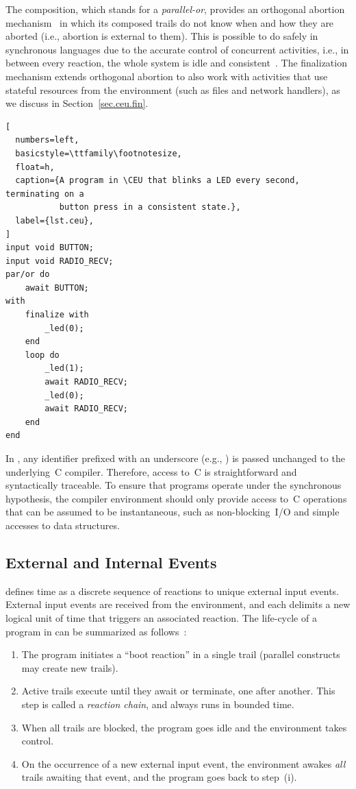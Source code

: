 The  composition, which stands for a \emph{parallel-or}, provides
an orthogonal abortion mechanism~\cite{esterel.preemption} in which its
composed trails do not know when and how they are aborted (i.e., abortion is
external to them).
%
This is possible to do safely in synchronous languages due to the accurate
control of concurrent activities, i.e., in between every reaction, the whole
system is idle and consistent~\cite{esterel.preemption}.
%
The finalization mechanism extends orthogonal abortion to also work with
activities that use stateful resources from the environment (such as files and
network handlers), as we discuss in Section~\ref{sec.ceu.fin}.
%

\begin{lstlisting}[
  numbers=left,
  basicstyle=\ttfamily\footnotesize,
  float=h,
  caption={A program in \CEU that blinks a LED every second, terminating on a
           button press in a consistent state.},
  label={lst.ceu},
]
input void BUTTON;
input void RADIO_RECV;
par/or do
    await BUTTON;
with
    finalize with
        _led(0);
    end
    loop do
        _led(1);
        await RADIO_RECV;
        _led(0);
        await RADIO_RECV;
    end
end
\end{lstlisting}

In \CEU, any identifier prefixed with an underscore (e.g., ) is
passed unchanged to the underlying~C compiler.
%
Therefore, access to~C is straightforward and syntactically traceable.
%
To ensure that programs operate under the synchronous hypothesis, the compiler
environment should only provide access to~C operations that can be assumed to
be instantaneous, such as non-blocking~I/O and simple accesses to data
structures.

\subsection{External and Internal Events}
\label{sec.ceu.evts}

\CEU defines time as a discrete sequence of reactions to unique external
input events.
%
External input events are received from the environment, and each delimits a
new logical unit of time that triggers an associated reaction.
%
The life-cycle of a program in \CEU can be summarized as
follows~\cite{ceu.sensys13}:
%
\begin{enumerate}[i]
\item The program initiates a ``boot reaction'' in a single trail (parallel
      constructs may create new trails).
\item Active trails execute until they await or terminate, one after
      another.  This step is called a \emph{reaction chain}, and always runs in
      bounded time.
\item When all trails are blocked, the program goes idle and the environment
      takes control.
\item On the occurrence of a new external input event, the environment
      awakes \emph{all} trails awaiting that event, and the program goes back to
      step~(i).
\end{enumerate}

